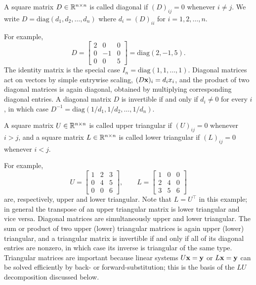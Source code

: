 \begin{definition}
    A square matrix $D \in \mathbb{R}^{n \times n}$ is called diagonal if $(D)_{ij} = 0$ whenever $i \neq j$. We write $D = \mathrm{diag}(d_1, d_2, \ldots, d_n)$ where $d_i = (D)_{ii}$ for $i=1,2,\ldots,n$.
\end{definition}
For example,
\begin{equation*}
    D = \begin{bmatrix}
        2 & 0 & 0 \\
        0 & -1 & 0 \\
        0 & 0 & 5
    \end{bmatrix} = \mathrm{diag}(2,-1,5).
\end{equation*}
The identity matrix is the special case $I_n = \mathrm{diag}(1,1,\ldots,1)$. Diagonal matrices act on vectors by simple entrywise scaling, $(D\mathbf{x})_i = d_i x_i$, and the product of two diagonal matrices is again diagonal, obtained by multiplying corresponding diagonal entries. A diagonal matrix $D$ is invertible if and only if $d_i \neq 0$ for every $i$, in which case $D^{-1} = \mathrm{diag}(1/d_1, 1/d_2, \ldots, 1/d_n)$.

\begin{definition}
    A square matrix $U \in \mathbb{R}^{n \times n}$ is called upper triangular if $(U)_{ij} = 0$ whenever $i > j$, and a square matrix $L \in \mathbb{R}^{n \times n}$ is called lower triangular if $(L)_{ij} = 0$ whenever $i < j$.
\end{definition}
For example,
\begin{equation*}
    U = \begin{bmatrix}
        1 & 2 & 3 \\
        0 & 4 & 5 \\
        0 & 0 & 6
    \end{bmatrix}, \qquad
    L = \begin{bmatrix}
        1 & 0 & 0 \\
        2 & 4 & 0 \\
        3 & 5 & 6
    \end{bmatrix}
\end{equation*}
are, respectively, upper and lower triangular. Note that $L = U^\top$ in this example; in general the transpose of an upper triangular matrix is lower triangular and vice versa. Diagonal matrices are simultaneously upper and lower triangular. The sum or product of two upper (lower) triangular matrices is again upper (lower) triangular, and a triangular matrix is invertible if and only if all of its diagonal entries are nonzero, in which case its inverse is triangular of the same type. Triangular matrices are important because linear systems $U\mathbf{x} = \mathbf{y}$ or $L\mathbf{x} = \mathbf{y}$ can be solved efficiently by back- or forward-substitution; this is the basis of the $LU$ decomposition discussed below.

